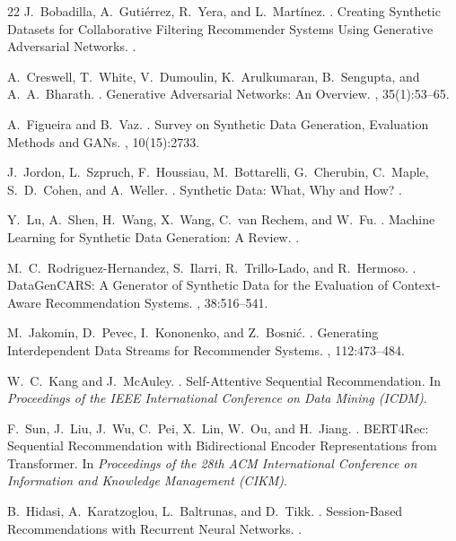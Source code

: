 \documentclass[sigconf,nonacm]{acmart}
\begin{document}
\begin{thebibliography}{22}
J.~Bobadilla, A.~Guti\'errez, R.~Yera, and L.~Mart\'inez.
.
\newblock Creating Synthetic Datasets for Collaborative Filtering Recommender Systems Using Generative Adversarial Networks.
.

A.~Creswell, T.~White, V.~Dumoulin, K.~Arulkumaran, B.~Sengupta, and A.~A.~Bharath.
.
\newblock Generative Adversarial Networks: An Overview.
, 35(1):53--65.

A.~Figueira and B.~Vaz.
.
\newblock Survey on Synthetic Data Generation, Evaluation Methods and GANs.
, 10(15):2733.

J.~Jordon, L.~Szpruch, F.~Houssiau, M.~Bottarelli, G.~Cherubin, C.~Maple, S.~D.~Cohen,
and A.~Weller.
.
\newblock Synthetic Data: What, Why and How?
.

Y.~Lu, A.~Shen, H.~Wang, X.~Wang, C.~van Rechem, and W.~Fu.
.
\newblock Machine Learning for Synthetic Data Generation: A Review.
.

M.~C.~Rodriguez-Hernandez, S.~Ilarri, R.~Trillo-Lado, and R.~Hermoso.
.
\newblock DataGenCARS: A Generator of Synthetic Data for the Evaluation of Context-Aware Recommendation Systems.
, 38:516--541.

M.~Jakomin, D.~Pevec, I.~Kononenko, and Z.~Bosni\'{c}.
.
\newblock Generating Interdependent Data Streams for Recommender Systems.
, 112:473--484.

W.~C.~Kang and J.~McAuley.
.
\newblock Self-Attentive Sequential Recommendation.
\newblock In {\em Proceedings of the IEEE International Conference on Data Mining (ICDM)}.

F.~Sun, J.~Liu, J.~Wu, C.~Pei, X.~Lin, W.~Ou, and H.~Jiang.
.
\newblock BERT4Rec: Sequential Recommendation with Bidirectional Encoder Representations from Transformer.
\newblock In {\em Proceedings of the 28th ACM International Conference on Information and Knowledge Management (CIKM)}.

B.~Hidasi, A.~Karatzoglou, L.~Baltrunas, and D.~Tikk.
.
\newblock Session-Based Recommendations with Recurrent Neural Networks.
.


\end{thebibliography}
\end{document}
